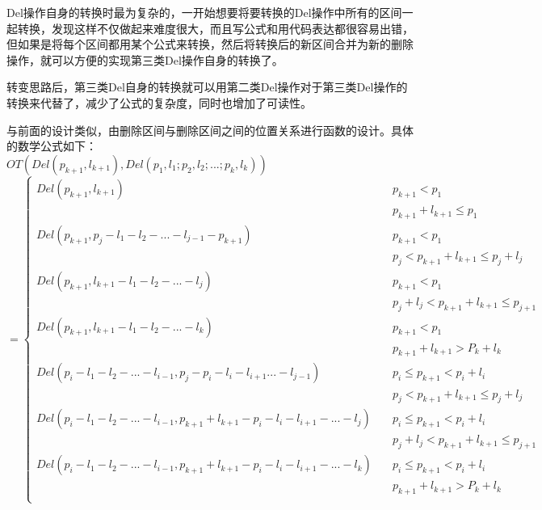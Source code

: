 \par Del操作自身的转换时最为复杂的，一开始想要将要转换的Del操作中所有的区间一起转换，发现这样不仅做起来难度很大，而且写公式和用代码表达都很容易出错，但如果是将每个区间都用某个公式来转换，然后将转换后的新区间合并为新的删除操作，就可以方便的实现第三类Del操作自身的转换了。
\par 转变思路后，第三类Del自身的转换就可以用第二类Del操作对于第三类Del操作的转换来代替了，减少了公式的复杂度，同时也增加了可读性。
\par 与前面的设计类似，由删除区间与删除区间之间的位置关系进行函数的设计。具体的数学公式如下：\\

\newpage
$OT(Del(p_{k+1},l_{k+1}),Del(p_1,l_1;p_2,l_2;...;p_k,l_k))$\\
\begin{equation}
= \begin{cases}
Del(p_{k+1},l_{k+1}) \quad &p_{k+1} < p_1 \quad \\ &p_{k+1}+l_{k+1} \le p_1 \\
Del(p_{k+1},p_j-l_1-l_2-...-l_{j-1}-p_{k+1}) \quad &p_{k+1} < p_1 \quad \\ &p_j < p_{k+1}+l_{k+1} \le p_j+l_j \\
Del(p_{k+1},l_{k+1}-l_1-l_2-...-l_j) \quad &p_{k+1} < p_1 \quad \\& p_j+l_j < p_{k+1}+l_{k+1} \le p_{j+1} \\
Del(p_{k+1},l_{k+1}-l_1-l_2-...-l_k) \quad &p_{k+1} < p_1 \quad \\& p_{k+1}+l_{k+1} > P_k+l_k  \\

Del(p_i-l_1-l_2-...-l_{i-1},p_j-p_i-l_i-l_{i+1}...-l_{j-1})        \quad &p_i \le p_{k+1} < p_i+l_i \quad \\ &p_j < p_{k+1}+l_{k+1} \le p_j+l_j \\
Del(p_i-l_1-l_2-...-l_{i-1},p_{k+1}+l_{k+1}-p_i-l_i-l_{i+1}-...-l_j) \quad &p_i \le p_{k+1} < p_i+l_i \quad \\& p_j+l_j < p_{k+1}+l_{k+1} \le p_{j+1} \\
Del(p_i-l_1-l_2-...-l_{i-1},p_{k+1}+l_{k+1}-p_i-l_i-l_{i+1}-...-l_k) \quad &p_i \le p_{k+1} < p_i+l_i \quad \\& p_{k+1}+l_{k+1} > P_k+l_k  \\



\end{cases}
\end{equation}
